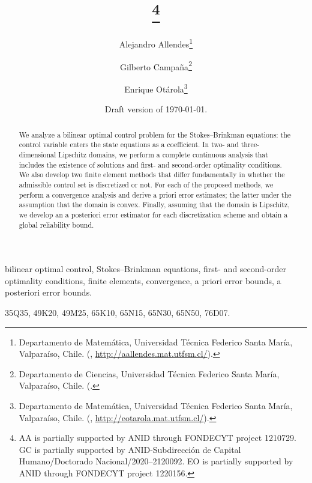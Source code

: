 \documentclass[final]{siamart0216}
\title{{\TheTitle}\thanks{AA is partially supported by ANID through FONDECYT project 1210729. GC is partially supported by ANID-Subdirecci\'on de Capital Humano/Doctorado Nacional/2020--2120092. 
EO is partially supported by ANID through FONDECYT project 1220156.}}
\author{Alejandro Allendes\thanks{Departamento de Matem\'atica, Universidad T\'ecnica Federico Santa Mar\'ia, Valpara\'iso, Chile.
(\email{alejandro.allendes@usm.cl}, \url{http://aallendes.mat.utfsm.cl/}).}
\and 
Gilberto Campa\~na\thanks{Departamento de Ciencias, Universidad T\'ecnica Federico Santa Mar\'ia, Valpara\'iso, Chile.
(\email{gilberto.campana@usm.cl}.}
\and
Enrique Ot\'arola\thanks{Departamento de Matem\'atica, Universidad T\'ecnica Federico Santa Mar\'ia, Valpara\'iso, Chile.
(\email{enrique.otarola@usm.cl}, \url{http://eotarola.mat.utfsm.cl/}).}   
}
\date{Draft version of \today.}
\begin{document}
\maketitle


\begin{abstract}
We analyze a bilinear optimal control problem for the Stokes--Brinkman equations: the control variable enters the state equations as a coefficient. In two- and three-dimensional Lipschitz domains, we perform a complete continuous analysis that includes the existence of solutions and first- and second-order optimality conditions. We also develop two finite element methods that differ fundamentally in whether the admissible control set is discretized or not. For each of the proposed methods, we perform a convergence analysis and derive a priori error estimates; the latter under the assumption that the domain is convex. Finally, assuming that the domain is Lipschitz, we develop an a posteriori error estimator for each discretization scheme and obtain a global reliability bound.
\end{abstract}

\begin{keywords}
bilinear optimal control, Stokes--Brinkman equations, first- and second-order optimality conditions, finite elements, convergence, a priori error bounds, a posteriori error bounds.
\end{keywords}

\begin{AMS}
35Q35,  %
49K20,  %
49M25,  %
65K10,  %
65N15,  %
65N30,  %
65N50,  %
76D07.  %
\end{AMS}

\end{document}
